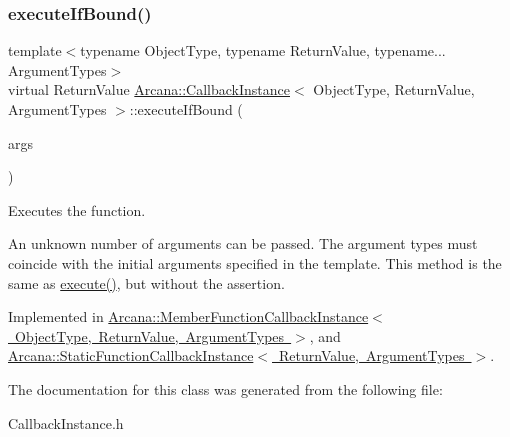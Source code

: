 \subsubsection{\texorpdfstring{execute\+If\+Bound()}{executeIfBound()}}
{\footnotesize\ttfamily template$<$typename Object\+Type, typename Return\+Value, typename... Argument\+Types$>$ \\
virtual Return\+Value \mbox{\hyperlink{class_arcana_1_1_callback_instance}{Arcana\+::\+Callback\+Instance}}$<$ Object\+Type, Return\+Value, Argument\+Types $>$\+::execute\+If\+Bound (\begin{DoxyParamCaption}\item[{Argument\+Types \&\&...}]{args }\end{DoxyParamCaption})\hspace{0.3cm}{\ttfamily [pure virtual]}}



Executes the function. 

An unknown number of arguments can be passed. The argument types must coincide with the initial arguments specified in the template. This method is the same as \mbox{\hyperlink{class_arcana_1_1_callback_instance_aa5bd9b4ee2129a0c22a98f7fa1cfc724}{execute()}}, but without the assertion. 

Implemented in \mbox{\hyperlink{class_arcana_1_1_member_function_callback_instance_a4d8c12162b9d7b42ad9916d2dba5327d}{Arcana\+::\+Member\+Function\+Callback\+Instance$<$ Object\+Type, Return\+Value, Argument\+Types $>$}}, and \mbox{\hyperlink{class_arcana_1_1_static_function_callback_instance_a1e498222014df725ab8dfb737b48c2ef}{Arcana\+::\+Static\+Function\+Callback\+Instance$<$ Return\+Value, Argument\+Types $>$}}.



The documentation for this class was generated from the following file\+:\begin{DoxyCompactItemize}
\item 
Callback\+Instance.\+h\end{DoxyCompactItemize}
